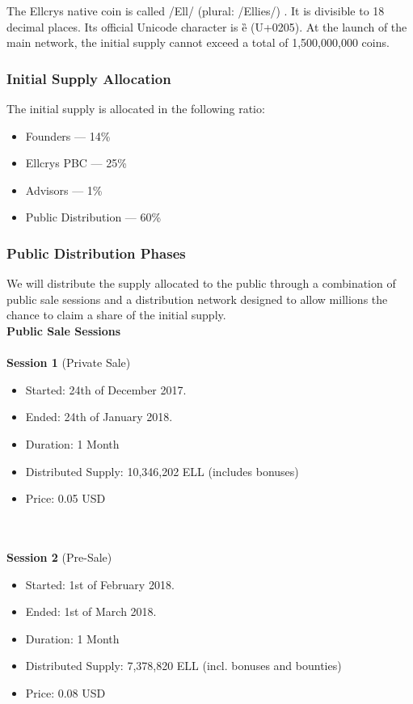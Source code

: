 The Ellcrys native coin is called /Ell/ (plural: /Ellies/) . It is divisible to 18 decimal places. Its official Unicode character is ȅ (U+0205). At the launch of the main network, the initial supply cannot exceed a total of 1,500,000,000 coins.

\newpage
\subsubsection{Initial Supply Allocation}
The initial supply is allocated in the following ratio:
\begin{itemize}
	\item Founders — 14\%
	\item Ellcrys PBC — 25\%
	\item Advisors — 1\%
	\item Public Distribution — 60\%
\end{itemize}

\subsubsection{Public Distribution Phases}
We will distribute the supply allocated to the public through a combination of public sale sessions and a distribution network designed to allow millions the chance to claim a share of the initial supply.\\

\noindent
\textbf{Public Sale Sessions} \\\\
\textbf{Session 1} (Private Sale)
\begin{itemize}
	\item Started: 24th of December 2017.
	\item Ended: 24th of January 2018.
	\item Duration: 1 Month
	\item Distributed Supply: 10,346,202 ELL (includes bonuses)
	\item Price: 0.05 USD
\end{itemize} \\

\noindent
\\\textbf{Session 2} (Pre-Sale)

\begin{itemize}
	\item Started: 1st of February 2018.
	\item Ended: 1st of March 2018.
	\item Duration: 1 Month
	\item Distributed Supply: 7,378,820 ELL (incl. bonuses and bounties)
	\item Price: 0.08 USD
\end{itemize} \\

